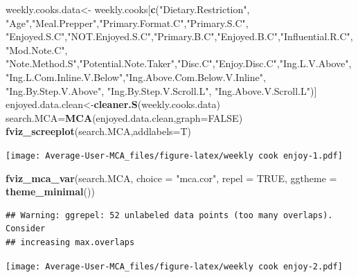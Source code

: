 \documentclass[
]{article}
\newenvironment{Shaded}{\begin{snugshade}}{\end{snugshade}}
\newcommand{\DataTypeTok}[1]{\textcolor[rgb]{0.13,0.29,0.53}{#1}}
\newcommand{\KeywordTok}[1]{\textcolor[rgb]{0.13,0.29,0.53}{\textbf{#1}}}
\newcommand{\NormalTok}[1]{#1}
\newcommand{\OtherTok}[1]{\textcolor[rgb]{0.56,0.35,0.01}{#1}}
\newcommand{\StringTok}[1]{\textcolor[rgb]{0.31,0.60,0.02}{#1}}
\begin{document}
\begin{Shaded}
\begin{Highlighting}[]
\NormalTok{weekly.cooks.data<-}\StringTok{ }\NormalTok{weekly.cooks[}\KeywordTok{c}\NormalTok{(}\StringTok{"Dietary.Restriction"}\NormalTok{, }\StringTok{"Age"}\NormalTok{,}\StringTok{"Meal.Prepper"}\NormalTok{,}\StringTok{"Primary.Format.C"}\NormalTok{,}\StringTok{"Primary.S.C"}\NormalTok{,}
            \StringTok{"Enjoyed.S.C"}\NormalTok{,}\StringTok{"NOT.Enjoyed.S.C"}\NormalTok{,}\StringTok{"Primary.B.C"}\NormalTok{,}\StringTok{"Enjoyed.B.C"}\NormalTok{,}\StringTok{"Influential.R.C"}\NormalTok{, }
            \StringTok{"Mod.Note.C"}\NormalTok{, }
            \StringTok{"Note.Method.S"}\NormalTok{,}\StringTok{"Potential.Note.Taker"}\NormalTok{,}\StringTok{"Disc.C"}\NormalTok{,}\StringTok{"Enjoy.Disc.C"}\NormalTok{,}\StringTok{"Ing.L.V.Above"}\NormalTok{,}
            \StringTok{"Ing.L.Com.Inline.V.Below"}\NormalTok{,}\StringTok{"Ing.Above.Com.Below.V.Inline"}\NormalTok{,  }\StringTok{"Ing.By.Step.V.Above"}\NormalTok{,  }\StringTok{"Ing.By.Step.V.Scroll.L"}\NormalTok{,}
            \StringTok{"Ing.Above.V.Scroll.L"}\NormalTok{)]}
\NormalTok{enjoyed.data.clean<-}\KeywordTok{cleaner.S}\NormalTok{(weekly.cooks.data)}
\NormalTok{search.MCA=}\KeywordTok{MCA}\NormalTok{(enjoyed.data.clean,}\DataTypeTok{graph=}\OtherTok{FALSE}\NormalTok{)}
\KeywordTok{fviz_screeplot}\NormalTok{(search.MCA,}\DataTypeTok{addlabels=}\NormalTok{T)}
\end{Highlighting}
\end{Shaded}

\texttt{[image: Average-User-MCA\_files/figure-latex/weekly cook enjoy-1.pdf]}

\begin{Shaded}
\begin{Highlighting}[]
\KeywordTok{fviz_mca_var}\NormalTok{(search.MCA, }\DataTypeTok{choice =} \StringTok{"mca.cor"}\NormalTok{, }\DataTypeTok{repel =} \OtherTok{TRUE}\NormalTok{,}
             \DataTypeTok{ggtheme =} \KeywordTok{theme_minimal}\NormalTok{())}
\end{Highlighting}
\end{Shaded}

\begin{verbatim}
## Warning: ggrepel: 52 unlabeled data points (too many overlaps). Consider
## increasing max.overlaps
\end{verbatim}

\texttt{[image: Average-User-MCA\_files/figure-latex/weekly cook enjoy-2.pdf]}
\end{document}
